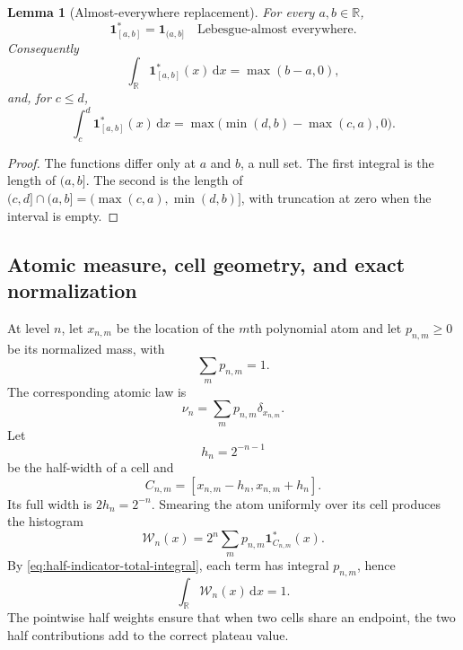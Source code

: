 \documentclass[11pt,oneside]{article}
\newtheorem{lemma}[theorem]{Lemma}
\theoremstyle{definition}
\theoremstyle{remark}
\newcommand{\R}{\mathbb R}
\newcommand{\dd}{\,\mathrm d}
\newcommand{\Wcal}{\mathcal W}
\begin{document}
\begin{lemma}[Almost-everywhere replacement]
\label{lem:half-indicator-ae}
For every $a,b\in\R$,
\begin{equation}
 \mathbf1_{[a,b]}^*=\mathbf1_{(a,b]}
 \quad\text{Lebesgue-almost everywhere}.
 \label{eq:half-indicator-ae}
\end{equation}
Consequently
\begin{equation}
 \int_\R\mathbf1_{[a,b]}^*(x)\dd x=\max(b-a,0),
 \label{eq:half-indicator-total-integral}
\end{equation}
and, for $c\le d$,
\begin{equation}
 \int_c^d\mathbf1_{[a,b]}^*(x)\dd x
 =\max\bigl(\min(d,b)-\max(c,a),0\bigr).
 \label{eq:half-indicator-overlap}
\end{equation}
\end{lemma}

\begin{proof}
The functions differ only at $a$ and $b$, a null set.  The first integral is the length of
$(a,b]$.  The second is the length of
$(c,d]\cap(a,b]=(\max(c,a),\min(d,b)]$, with truncation at zero when the interval is empty.
\end{proof}

\subsection{Atomic measure, cell geometry, and exact normalization}

At level $n$, let $x_{n,m}$ be the location of the $m$th polynomial atom and let
$p_{n,m}\ge0$ be its normalized mass, with
\begin{equation}
 \sum_m p_{n,m}=1.
 \label{eq:atomic-mass-one}
\end{equation}
The corresponding atomic law is
\begin{equation}
 \nu_n=\sum_m p_{n,m}\delta_{x_{n,m}}.
 \label{eq:polynomial-atomic-law}
\end{equation}
Let
\begin{equation}
 h_n=2^{-n-1}
 \label{eq:step-half-width}
\end{equation}
be the half-width of a cell and
\begin{equation}
 C_{n,m}=[x_{n,m}-h_n,x_{n,m}+h_n].
 \label{eq:step-cell}
\end{equation}
Its full width is $2h_n=2^{-n}$.  Smearing the atom uniformly over its cell produces the
histogram
\begin{equation}
 \Wcal_n(x)=2^n\sum_m p_{n,m}\mathbf1^*_{C_{n,m}}(x).
 \label{eq:histogram-from-atoms}
\end{equation}
By \eqref{eq:half-indicator-total-integral}, each term has integral $p_{n,m}$, hence
\begin{equation}
 \int_\R\Wcal_n(x)\dd x=1.
 \label{eq:histogram-mass-one}
\end{equation}
The pointwise half weights ensure that when two cells share an endpoint, the two half
contributions add to the correct plateau value.
\end{document}
